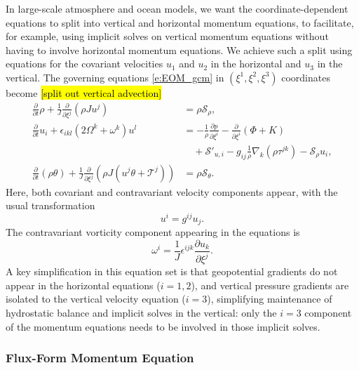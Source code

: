 \documentclass{report}
\begin{document}
In large-scale atmosphere and ocean models, we want the coordinate-dependent equations to split into vertical and horizontal momentum equations, to facilitate, for example, using implicit solves on vertical momentum equations without having to involve horizontal momentum equations. We achieve such a split using equations for the covariant velocities $u_1$ and $u_2$ in the horizontal and $u_3$ in the vertical. The governing equations \eqref{e:EOM_gcm} in  $(\xi^1, \xi^2, \xi^3)$ coordinates become \hl{[split out vertical advection]}
\begin{subequations}
\begin{align}
\frac{\partial}{\partial t}  \rho + \frac{1}{J} \frac{\partial}{\partial \xi^j} \left(\rho J u^j\right)
    & = \rho \mathcal{S}_\rho,
    \label{e:equations_coord_hor_vert:density}\\
    \frac{\partial}{\partial t} u_i + \epsilon_{ikl} (2\Omega^k + \omega^k) u^l 
    &=  -\frac{1}{\rho} \frac{\partial p}{\partial\xi^i} 
   -  \frac{\partial}{\partial \xi^i} (\Phi + K)  \nonumber\\
    & \quad + \mathcal{S}'_{u, i} - g_{ij} \frac{1}{\rho} \nabla_k (\rho \tau^{jk}) - \mathcal{S}_\rho u_i,
    \label{e:equations_coord_hor_vert:velocity}\\
        \frac{\partial}{\partial t}  (\rho \theta) + \frac{1}{J} \frac{\partial}{\partial \xi^j} \left(\rho J (u^j \theta + \mathcal{T}^j)\right)
    & = \rho \mathcal{S}_\theta.
    \label{e:equations_coord_hor_vert:theta}
\end{align}
\end{subequations}
Here, both covariant and contravariant velocity components appear, with the usual transformation
\[
u^i = g^{ij} u_j.
\]
The contravariant vorticity component appearing in the equations is 
\[
\omega^i = \frac{1}{J} \epsilon^{ijk} \frac{\partial u_k}{\partial \xi^j}.
\]
A key simplification in this equation set is that geopotential gradients do not appear in the horizontal equations ($i=1, 2$), and vertical pressure gradients are isolated to the vertical velocity equation ($i=3$), simplifying maintenance of hydrostatic balance and implicit solves in the vertical: only the $i=3$ component of the momentum equations needs to be involved in those implicit solves.

\subsubsection{Flux-Form Momentum Equation}
\end{document}
